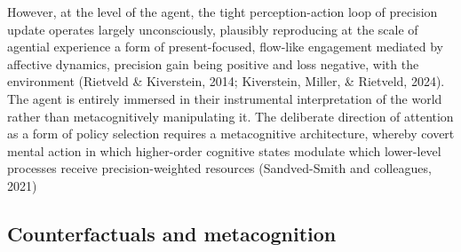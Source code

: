 \documentclass[11pt,a4paper]{article}
\begin{document}
However, at the level of the agent, the tight perception-action loop of precision update operates largely unconsciously, plausibly reproducing at the scale of agential experience a form of present-focused, flow-like engagement mediated by affective dynamics, precision gain being positive and loss negative, with the environment (Rietveld \& Kiverstein, 2014; Kiverstein, Miller, \& Rietveld, 2024). The agent is entirely immersed in their instrumental interpretation of the world rather than metacognitively manipulating it. The deliberate direction of attention as a form of policy selection requires a metacognitive architecture, whereby covert mental action in which higher-order cognitive states modulate which lower-level processes receive precision-weighted resources (Sandved-Smith and colleagues, 2021)


\subsection{Counterfactuals and metacognition}
\end{document}
